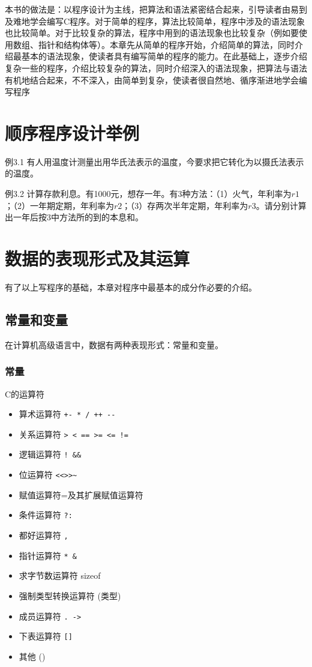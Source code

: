 本书的做法是：以程序设计为主线，把算法和语法紧密结合起来，引导读者由易到及难地学会编写C程序。对于简单的程序，算法比较简单，程序中涉及的语法现象也比较简单。对于比较复杂的算法，程序中用到的语法现象也比较复杂（例如要使用数组、指针和结构体等）。本章先从简单的程序开始，介绍简单的算法，同时介绍最基本的语法现象，使读者具有编写简单的程序的能力。在此基础上，逐步介绍复杂一些的程序，介绍比较复杂的算法，同时介绍深入的语法现象，把算法与语法有机地结合起来，不不深入，由简单到复杂，使读者很自然地、循序渐进地学会编写程序
\section{顺序程序设计举例}
例3.1 有人用温度计测量出用华氏法表示的温度，今要求把它转化为以摄氏法表示的温度。

例3.2 计算存款利息。有1000元，想存一年。有3种方法：（1）火气，年利率为$r1$；（2）一年期定期，年利率为$r2$；（3）存两次半年定期，年利率为$r3$。请分别计算出一年后按3中方法所的到的本息和。
\section{数据的表现形式及其运算}
有了以上写程序的基础，本章对程序中最基本的成分作必要的介绍。
\subsection{常量和变量}
在计算机高级语言中，数据有两种表现形式：常量和变量。
\subsubsection{常量}
C的运算符
\begin{itemize}
	\item 算术运算符	\verb|+- * / ++ --|
	\item 关系运算符	\verb|> < == >= <= !=|
	\item 逻辑运算符 	\verb|! && |
	\item 位运算符		\verb|<<>>~ |
	\item 赋值运算符=及其扩展赋值运算符
	\item 条件运算符	\verb|?:|
	\item 都好运算符	\verb|,|
	\item 指针运算符	\verb|* &|
	\item 求字节数运算符	sizeof
	\item 强制类型转换运算符	(类型)
	\item 成员运算符	\verb|. ->|
	\item 下表运算符	\verb|[]|
	\item 其他  ()
\end{itemize}


